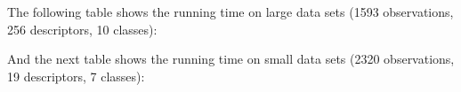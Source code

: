 \documentclass{article}
\begin{document}
The following table shows the running time on large data sets (1593 observations, 256 descriptors, 10 classes):


And the next table shows the running time on small data sets (2320 observations, 19 descriptors, 7 classes):

\end{document}
